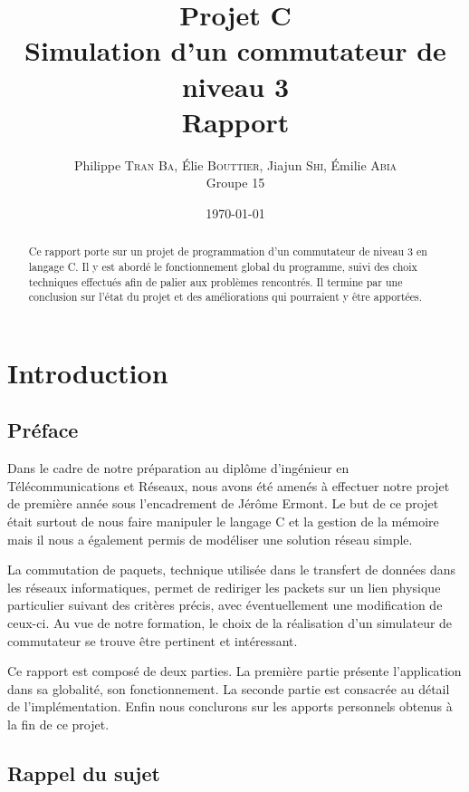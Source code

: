 \documentclass[a4paper,11pt]{article}
\title{Projet C\\Simulation d'un commutateur de niveau 3\\Rapport}
\author{Philippe \textsc{Tran Ba}, Élie \textsc{Bouttier},
Jiajun \textsc{Shi}, Émilie \textsc{Abia}\\Groupe 15}
\date\today
\begin{document}
\maketitle

\begin{abstract}

Ce rapport porte sur un projet de programmation d'un commutateur de niveau 3 en langage C. Il y est abordé le fonctionnement global du programme, suivi des choix techniques effectués afin de palier aux problèmes rencontrés. Il termine par une conclusion sur l'état du projet et des améliorations qui pourraient y être apportées.

\end{abstract}

\tableofcontents

\newpage

\section{Introduction}
\subsection{Préface}

Dans le cadre de notre préparation au diplôme d'ingénieur en Télécommunications et Réseaux, nous avons été amenés à effectuer notre projet de première année sous l'encadrement de Jérôme Ermont. Le but de ce projet était surtout de nous faire manipuler le langage C et la gestion de la mémoire mais il nous a également permis de modéliser une solution réseau simple.

La commutation de paquets, technique utilisée dans le transfert de données dans les réseaux informatiques, permet de rediriger les packets sur un lien physique particulier suivant des critères précis, avec éventuellement une modification de ceux-ci. Au vue de notre formation, le choix de la réalisation d'un simulateur de commutateur se trouve être pertinent et intéressant.

Ce rapport est composé de deux parties. La première partie présente l'application dans sa globalité, son fonctionnement. La seconde partie est consacrée au détail de l'implémentation. Enfin nous conclurons sur les apports personnels obtenus à la fin de ce projet.

\subsection{Rappel du sujet}
\end{document}
